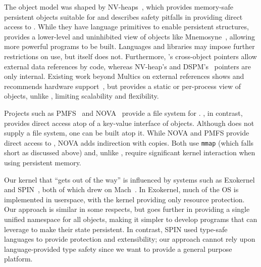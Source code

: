 {    The \Twizzler object model was shaped by
    NV-heaps~\cite{coburn:asplos11}, which provides memory-safe persistent objects
    suitable for \NVM and describes safety pitfalls in
    providing direct access to \NVM. While they
    have language primitives to enable persistent
    structures, \Twizzler provides a lower-level and uninhibited view of
    objects like Mnemosyne~\cite{volos:asplos11}, allowing
    more powerful programs to be built. Languages and libraries may impose
    further restrictions on \NVM use, but \Twizzler itself does not.
    Furthermore, \Twizzler's cross-object pointers allow external data
    references by code, whereas NV-heap's and DSPM's~\cite{shan:socc17} pointers are
    only internal. Existing work beyond Multics on external references shows and
    recommends hardware support~\cite{wang:micro17,libpmem}, but provides a
    static or per-process view of objects, unlike \Twizzler, limiting scalability and flexibility.

    Projects such as PMFS~\cite{dulloor:eurosys14} and
    NOVA~\cite{Xu:nova} provide a file system for \NVM. \Twizzler, in
    contrast, provides direct \NVM access atop of a key-value interface of objects.
    Although \Twizzler does not supply a file system, one can be built
    atop it. While NOVA
    and PMFS provide direct access to \NVM, NOVA adds indirection
    with copies. Both use \texttt{mmap} (which falls short as
    discussed above) and, unlike \Twizzler, require significant kernel interaction
    when using persistent memory.

    Our kernel that ``gets out of the way'' is influenced by systems
    such as Exokernel~\cite{engler:sosp95} and SPIN~\cite{bershad:sosp95}, both of
    which drew on Mach~\cite{accetta:usenix86s}. In
    Exokernel, much of the OS is implemented in userspace, with the kernel providing only resource protection. Our approach is
    similar in some respects, but goes further in providing a single unified
    namespace for all objects, making it simpler to develop programs
    that can leverage \NVM to make their state persistent.
    In contrast, SPIN used type-safe languages to provide protection and
    extensibility; our approach cannot rely upon language-provided type safety since
    we want to provide a general purpose platform.

}

